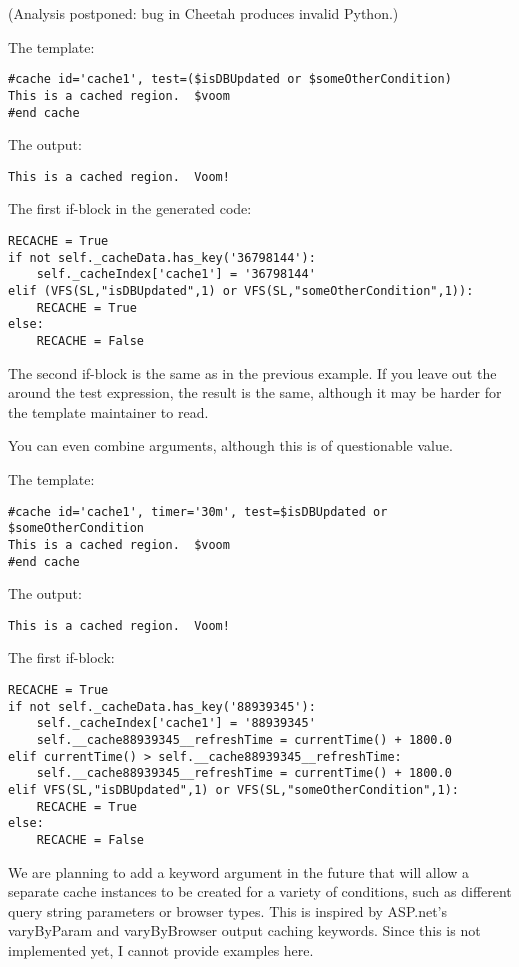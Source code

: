 (Analysis postponed: bug in Cheetah produces invalid Python.)




The template:
\begin{verbatim}
#cache id='cache1', test=($isDBUpdated or $someOtherCondition)
This is a cached region.  $voom
#end cache
\end{verbatim}

The output:
\begin{verbatim}
This is a cached region.  Voom!
\end{verbatim}

The first if-block in the generated code:
\begin{verbatim}
RECACHE = True
if not self._cacheData.has_key('36798144'):
    self._cacheIndex['cache1'] = '36798144'
elif (VFS(SL,"isDBUpdated",1) or VFS(SL,"someOtherCondition",1)):
    RECACHE = True
else:
    RECACHE = False
\end{verbatim}
The second if-block is the same as in the previous example.  If you leave
out the \code{()} around the test expression, the result is the same, although
it may be harder for the template maintainer to read.

You can even combine arguments, although this is of questionable value.

The template:
\begin{verbatim}
#cache id='cache1', timer='30m', test=$isDBUpdated or $someOtherCondition
This is a cached region.  $voom
#end cache
\end{verbatim}

The output:
\begin{verbatim}
This is a cached region.  Voom!
\end{verbatim}

The first if-block:
\begin{verbatim}
RECACHE = True
if not self._cacheData.has_key('88939345'):
    self._cacheIndex['cache1'] = '88939345'
    self.__cache88939345__refreshTime = currentTime() + 1800.0
elif currentTime() > self.__cache88939345__refreshTime:
    self.__cache88939345__refreshTime = currentTime() + 1800.0
elif VFS(SL,"isDBUpdated",1) or VFS(SL,"someOtherCondition",1):
    RECACHE = True
else:
    RECACHE = False
\end{verbatim}

We are planning to add a  keyword argument in the future that
will allow a separate cache instances to be created for a variety of conditions,
such as different query string parameters or browser types. This is inspired by
ASP.net's varyByParam and varyByBrowser output caching keywords.  Since this is
not implemented yet, I cannot provide examples here.

